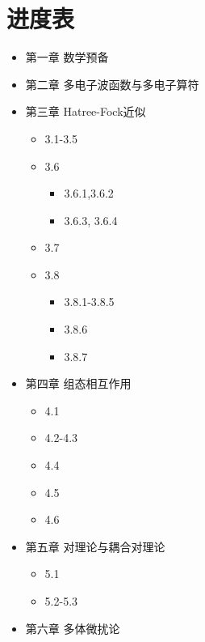 \chapter*{进度表}
\begin{itemize}
    \item[\CheckedBox] 第一章  数学预备
    \item[\CheckedBox] 第二章  多电子波函数与多电子算符
    \item[\DSquare] 第三章  Hatree-Fock近似 
    	\begin{itemize}
		    \item[\CheckedBox] 3.1-3.5
		    \item[\DSquare] 3.6 
		    	\begin{itemize}
		            \item[\CheckedBox] 3.6.1,3.6.2
		            \item[\Square] 3.6.3, 3.6.4
		        \end{itemize}
		    \item[\Square] 3.7
		    \item[\DSquare] 3.8 
			   \begin{itemize}
				     \item[\CheckedBox] 3.8.1-3.8.5
				     \item[\Square] 3.8.6
				     \item[\DSquare] 3.8.7
			   \end{itemize}
    	\end{itemize}
    \item[\DSquare] 
    	第四章 组态相互作用 
	    \begin{itemize}
	        \item[\DSquare] 4.1
	        \item[\Square] 4.2-4.3
	        \item[\CheckedBox] 4.4
	        \item[\DSquare] 4.5
		\item[\Square] 4.6
	    \end{itemize}
    \item[\DSquare] 第五章 对理论与耦合对理论 
	    \begin{itemize}
	        \item[\DSquare] 5.1
	        \item[\Square] 5.2-5.3
	    \end{itemize}
    \item[\CheckedBox] 第六章 多体微扰论 

\end{itemize}
